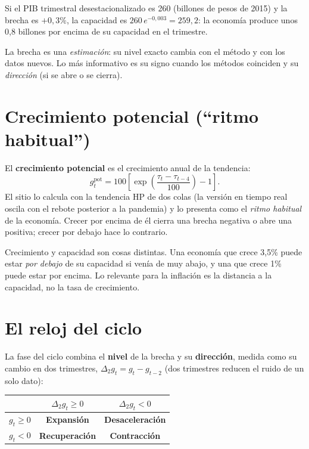 \begin{dato}
Si el PIB trimestral desestacionalizado es 260 (billones de pesos de 2015) y la brecha es $+0{,}3\%$, la capacidad
es $260\,e^{-0{,}003}=259{,}2$: la economía produce unos 0,8 billones por encima de su capacidad en el trimestre.
\end{dato}

\begin{alerta}
La brecha es una \emph{estimación}: su nivel exacto cambia con el método y con los datos nuevos. Lo más informativo
es su signo cuando los métodos coinciden y su \emph{dirección} (si se abre o se cierra).
\end{alerta}

\section{Crecimiento potencial (``ritmo habitual'')}
\label{es:f:potencial}
El \textbf{crecimiento potencial} es el crecimiento anual de la tendencia:
\[
g^{\text{pot}}_t=100\left[\exp\!\left(\frac{\tau_t-\tau_{t-4}}{100}\right)-1\right].
\]
El sitio lo calcula con la tendencia HP de dos colas (la versión en tiempo real oscila con el rebote posterior a la
pandemia) y lo presenta como el \emph{ritmo habitual} de la economía. Crecer por encima de él cierra una brecha
negativa o abre una positiva; crecer por debajo hace lo contrario.

\begin{leer}
Crecimiento y capacidad son cosas distintas. Una economía que crece 3,5\% puede estar \emph{por debajo} de su
capacidad si venía de muy abajo, y una que crece 1\% puede estar por encima. Lo relevante para la inflación es la
distancia a la capacidad, no la tasa de crecimiento.
\end{leer}

\section{El reloj del ciclo}
\label{es:f:reloj}
La fase del ciclo combina el \textbf{nivel} de la brecha y su \textbf{dirección}, medida como su cambio en dos
trimestres, $\Delta_2 g_t=g_t-g_{t-2}$ (dos trimestres reducen el ruido de un solo dato):

\begin{center}
\begin{tabular}{@{}lcc@{}}
\toprule
 & $\Delta_2 g_t\ge 0$ & $\Delta_2 g_t<0$\\\midrule
$g_t\ge 0$ & \textcolor{cmgreen}{\textbf{Expansión}} & \textcolor{cmamber}{\textbf{Desaceleración}}\\
$g_t<0$ & \textcolor{cmblue}{\textbf{Recuperación}} & \textcolor{cmred}{\textbf{Contracción}}\\
\bottomrule
\end{tabular}
\end{center}

